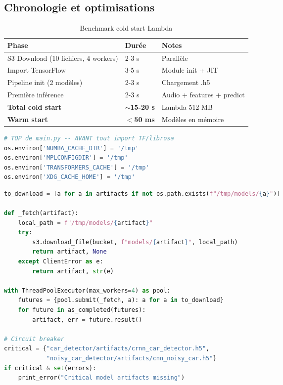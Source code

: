 \documentclass[11pt,a4paper]{article}
\begin{document}
\subsection{Chronologie et optimisations}

\begin{table}[htbp]
\centering
\begin{tabular}{@{}lll@{}}
\toprule
\textbf{Phase} & \textbf{Durée} & \textbf{Notes} \\
\midrule
S3 Download (10 fichiers, 4 workers) & 2-3 s & Parallèle \\
Import TensorFlow & 3-5 s & Module init + JIT \\
Pipeline init (2 modèles) & 2-3 s & Chargement .h5 \\
Première inférence & 2-3 s & Audio + features + predict \\
\textbf{Total cold start} & \textbf{$\sim$15-20 s} & Lambda 512 MB \\
\textbf{Warm start} & \textbf{$<$50 ms} & Modèles en mémoire \\
\bottomrule
\end{tabular}
\caption{Benchmark cold start Lambda}
\end{table}

\begin{lstlisting}[language=Python,caption={Optimisation 1 — Caches avant imports}]
# TOP de main.py -- AVANT tout import TF/librosa
os.environ['NUMBA_CACHE_DIR'] = '/tmp'
os.environ['MPLCONFIGDIR'] = '/tmp'
os.environ['TRANSFORMERS_CACHE'] = '/tmp'
os.environ['XDG_CACHE_HOME'] = '/tmp'
\end{lstlisting}

\begin{lstlisting}[language=Python,caption={Optimisation 2 — Download S3 parallèle}]
to_download = [a for a in artifacts if not os.path.exists(f"/tmp/models/{a}")]

def _fetch(artifact):
    local_path = f"/tmp/models/{artifact}"
    try:
        s3.download_file(bucket, f"models/{artifact}", local_path)
        return artifact, None
    except ClientError as e:
        return artifact, str(e)

with ThreadPoolExecutor(max_workers=4) as pool:
    futures = {pool.submit(_fetch, a): a for a in to_download}
    for future in as_completed(futures):
        artifact, err = future.result()

# Circuit breaker
critical = {"car_detector/artifacts/crnn_car_detector.h5",
            "noisy_car_detector/artifacts/cnn_noisy_car.h5"}
if critical & set(errors):
    print_error("Critical model artifacts missing")
\end{lstlisting}
\end{document}
